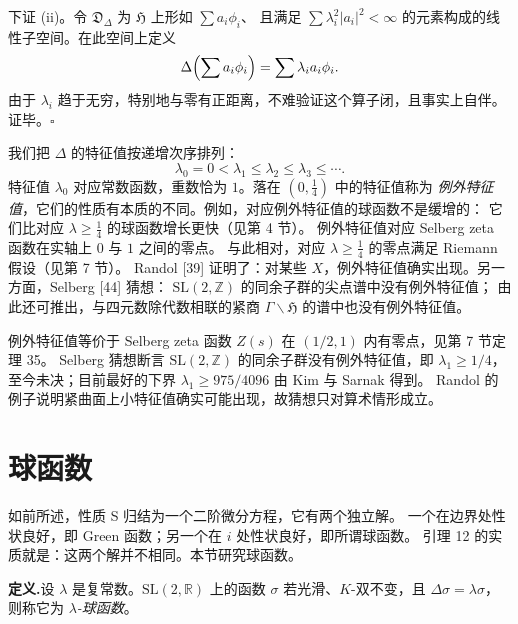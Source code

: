 下证 (ii)。令 $\mathfrak{D}_{\Delta}$ 为 $\mathfrak{H}$ 上形如 $\sum a_{i}\phi_{i}$、
且满足 $\sum\lambda_{i}^{2}|a_{i}|^{2}<\infty$ 的元素构成的线性子空间。在此空间上定义
\[
\Delta\Bigl(\sum a_{i}\phi_{i}\Bigr)=\sum\lambda_{i}a_{i}\phi_{i}.
\]
由于 $\lambda_{i}$ 趋于无穷，特别地与零有正距离，不难验证这个算子闭，且事实上自伴。
证毕。\hfill$\square$

我们把 $\Delta$ 的特征值按递增次序排列：
\[
\lambda_{0}=0<\lambda_{1}\le\lambda_{2}\le\lambda_{3}\le\cdots .
\]
特征值 $\lambda_{0}$ 对应常数函数，重数恰为 $1$。落在 $(0,\tfrac14)$ 中的特征值称为
\emph{例外特征值}，它们的性质有本质的不同。例如，对应例外特征值的球函数不是缓增的：
它们比对应 $\lambda\ge\tfrac14$ 的球函数增长更快（见第 4 节）。
例外特征值对应 Selberg zeta 函数在实轴上 $0$ 与 $1$ 之间的零点。
与此相对，对应 $\lambda\ge\tfrac14$ 的零点满足 Riemann 假设（见第 7 节）。
Randol [39] 证明了：对某些 $X$，例外特征值确实出现。另一方面，Selberg [44] 猜想：
$\mathrm{SL}(2,\mathbb{Z})$ 的同余子群的尖点谱中没有例外特征值；
由此还可推出，与四元数除代数相联的紧商 $\Gamma\backslash\mathfrak{H}$ 的谱中也没有例外特征值。

\begin{annote}
例外特征值等价于 Selberg zeta 函数 $Z(s)$ 在 $(1/2,1)$ 内有零点，见第 7 节定理 35。
Selberg 猜想断言 $\mathrm{SL}(2,\mathbb{Z})$ 的同余子群没有例外特征值，即 $\lambda_{1}\ge1/4$，
至今未决；目前最好的下界 $\lambda_{1}\ge975/4096$ 由 Kim 与 Sarnak 得到。
Randol 的例子说明紧曲面上小特征值确实可能出现，故猜想只对算术情形成立。
\par\vspace{0.15em}{\raggedleft 【来源：Selberg, J. Indian Math. Soc. 20 (1956)；Randol, Bull. Amer. Math. Soc. 80 (1974)；Kim--Sarnak, J. Amer. Math. Soc. 16 (2003)（A）】\par}
\end{annote}

\section{球函数}

如前所述，性质 S 归结为一个二阶微分方程，它有两个独立解。
一个在边界处性状良好，即 Green 函数；另一个在 $i$ 处性状良好，即所谓球函数。
引理 12 的实质就是：这两个解并不相同。本节研究球函数。

\par\medskip\noindent\textbf{定义.}\quad 设 $\lambda$ 是复常数。$\mathrm{SL}(2,\mathbb{R})$ 上的函数
$\sigma$ 若光滑、$K$-双不变，且 $\Delta\sigma=\lambda\sigma$，则称它为 \emph{$\lambda$-球函数}。

